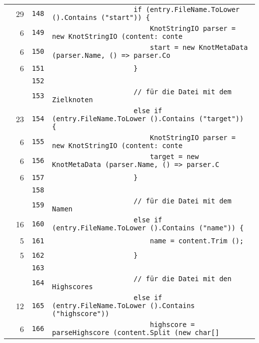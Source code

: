 \documentclass[a4paper,10pt]{article}
\begin{document}
\begin{longtable}[l]{lrrl}
\cellcolor{green} & 29 & \verb~148~ & \verb~                    if (entry.FileName.ToLower ().Contains ("start")) {~\\
\cellcolor{green} & 6 & \verb~149~ & \verb~                        KnotStringIO parser = new KnotStringIO (content: conte~\\
\cellcolor{green} & 6 & \verb~150~ & \verb~                        start = new KnotMetaData (parser.Name, () => parser.Co~\\
\cellcolor{green} & 6 & \verb~151~ & \verb~                    }~\\
\cellcolor{gray} &  & \verb~152~ & \verb~~\\
\cellcolor{gray} &  & \verb~153~ & \verb~                    // für die Datei mit dem Zielknoten~\\
\cellcolor{green} & 23 & \verb~154~ & \verb~                    else if (entry.FileName.ToLower ().Contains ("target")) {~\\
\cellcolor{green} & 6 & \verb~155~ & \verb~                        KnotStringIO parser = new KnotStringIO (content: conte~\\
\cellcolor{green} & 6 & \verb~156~ & \verb~                        target = new KnotMetaData (parser.Name, () => parser.C~\\
\cellcolor{green} & 6 & \verb~157~ & \verb~                    }~\\
\cellcolor{gray} &  & \verb~158~ & \verb~~\\
\cellcolor{gray} &  & \verb~159~ & \verb~                    // für die Datei mit dem Namen~\\
\cellcolor{green} & 16 & \verb~160~ & \verb~                    else if (entry.FileName.ToLower ().Contains ("name")) {~\\
\cellcolor{green} & 5 & \verb~161~ & \verb~                        name = content.Trim ();~\\
\cellcolor{green} & 5 & \verb~162~ & \verb~                    }~\\
\cellcolor{gray} &  & \verb~163~ & \verb~~\\
\cellcolor{gray} &  & \verb~164~ & \verb~                    // für die Datei mit den Highscores~\\
\cellcolor{green} & 12 & \verb~165~ & \verb~                    else if (entry.FileName.ToLower ().Contains ("highscore"))~\\
\cellcolor{green} & 6 & \verb~166~ & \verb~                        highscore = parseHighscore (content.Split (new char[] ~\\

\end{longtable}
\end{document}

